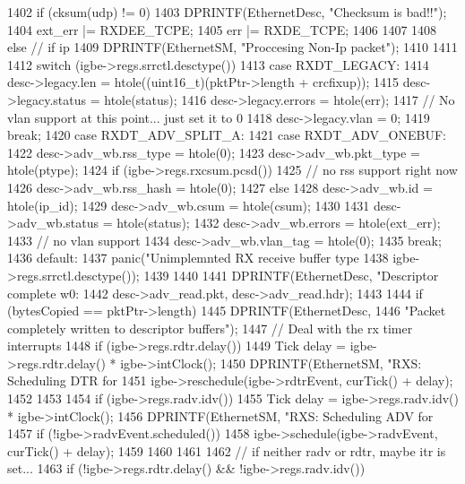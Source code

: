 \begin{DoxyCode}
{{{1402             if (cksum(udp) != 0) {
1403                 DPRINTF(EthernetDesc, "Checksum is bad!!\n");
1404                 ext_err |= RXDEE_TCPE;
1405                 err |= RXDE_TCPE;
1406             }
1407         }
1408     } else { // if ip
1409         DPRINTF(EthernetSM, "Proccesing Non-Ip packet\n");
1410     }
1411 
1412     switch (igbe->regs.srrctl.desctype()) {
1413       case RXDT_LEGACY:
1414         desc->legacy.len = htole((uint16_t)(pktPtr->length + crcfixup));
1415         desc->legacy.status = htole(status);
1416         desc->legacy.errors = htole(err);
1417         // No vlan support at this point... just set it to 0
1418         desc->legacy.vlan = 0;
1419         break;
1420       case RXDT_ADV_SPLIT_A:
1421       case RXDT_ADV_ONEBUF:
1422         desc->adv_wb.rss_type = htole(0);
1423         desc->adv_wb.pkt_type = htole(ptype);
1424         if (igbe->regs.rxcsum.pcsd()) {
1425             // no rss support right now
1426             desc->adv_wb.rss_hash = htole(0);
1427         } else {
1428             desc->adv_wb.id = htole(ip_id);
1429             desc->adv_wb.csum = htole(csum);
1430         }
1431         desc->adv_wb.status = htole(status);
1432         desc->adv_wb.errors = htole(ext_err);
1433         // no vlan support
1434         desc->adv_wb.vlan_tag = htole(0); 
1435         break;
1436       default:
1437         panic("Unimplemnted RX receive buffer type %
1438               igbe->regs.srrctl.desctype());
1439     }
1440 
1441     DPRINTF(EthernetDesc, "Descriptor complete w0: %
1442             desc->adv_read.pkt, desc->adv_read.hdr);
1443 
1444     if (bytesCopied == pktPtr->length) {
1445         DPRINTF(EthernetDesc,
1446                 "Packet completely written to descriptor buffers\n");
1447         // Deal with the rx timer interrupts
1448         if (igbe->regs.rdtr.delay()) {
1449             Tick delay = igbe->regs.rdtr.delay() * igbe->intClock();
1450             DPRINTF(EthernetSM, "RXS: Scheduling DTR for %
1451             igbe->reschedule(igbe->rdtrEvent, curTick() + delay);
1452         }
1453 
1454         if (igbe->regs.radv.idv()) {
1455             Tick delay = igbe->regs.radv.idv() * igbe->intClock();
1456             DPRINTF(EthernetSM, "RXS: Scheduling ADV for %
1457             if (!igbe->radvEvent.scheduled()) {
1458                 igbe->schedule(igbe->radvEvent, curTick() + delay);
1459             }
1460         }
1461 
1462         // if neither radv or rdtr, maybe itr is set...
1463         if (!igbe->regs.rdtr.delay() && !igbe->regs.radv.idv()) {
}}}
\end{DoxyCode}

